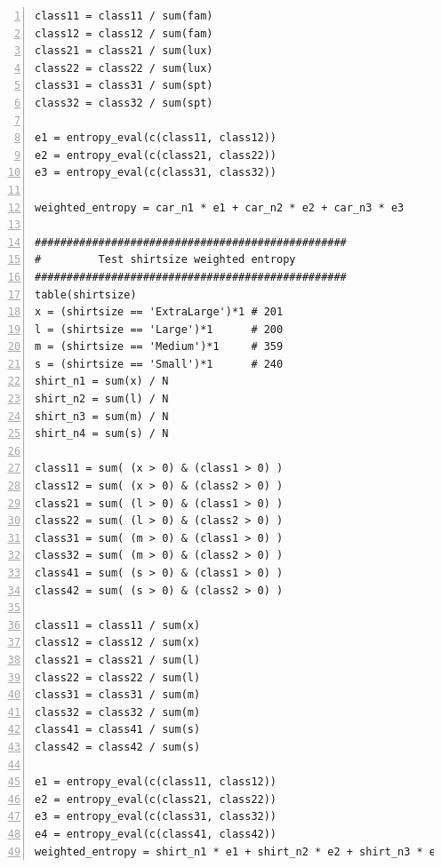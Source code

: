 \documentclass[11pt]{article}
\begin{document}
\begin{Verbatim}[numbers=left]
class11 = class11 / sum(fam)
class12 = class12 / sum(fam)
class21 = class21 / sum(lux)
class22 = class22 / sum(lux)
class31 = class31 / sum(spt)
class32 = class32 / sum(spt)

e1 = entropy_eval(c(class11, class12))
e2 = entropy_eval(c(class21, class22))
e3 = entropy_eval(c(class31, class32))

weighted_entropy = car_n1 * e1 + car_n2 * e2 + car_n3 * e3

#################################################
#         Test shirtsize weighted entropy
#################################################
table(shirtsize)
x = (shirtsize == 'ExtraLarge')*1 # 201
l = (shirtsize == 'Large')*1      # 200
m = (shirtsize == 'Medium')*1     # 359
s = (shirtsize == 'Small')*1      # 240
shirt_n1 = sum(x) / N
shirt_n2 = sum(l) / N
shirt_n3 = sum(m) / N
shirt_n4 = sum(s) / N

class11 = sum( (x > 0) & (class1 > 0) )
class12 = sum( (x > 0) & (class2 > 0) )
class21 = sum( (l > 0) & (class1 > 0) )
class22 = sum( (l > 0) & (class2 > 0) )
class31 = sum( (m > 0) & (class1 > 0) )
class32 = sum( (m > 0) & (class2 > 0) )
class41 = sum( (s > 0) & (class1 > 0) )
class42 = sum( (s > 0) & (class2 > 0) )

class11 = class11 / sum(x)
class12 = class12 / sum(x)
class21 = class21 / sum(l)
class22 = class22 / sum(l)
class31 = class31 / sum(m)
class32 = class32 / sum(m)
class41 = class41 / sum(s)
class42 = class42 / sum(s)

e1 = entropy_eval(c(class11, class12))
e2 = entropy_eval(c(class21, class22))
e3 = entropy_eval(c(class31, class32))
e4 = entropy_eval(c(class41, class42))
weighted_entropy = shirt_n1 * e1 + shirt_n2 * e2 + shirt_n3 * e3 + shirt_n4 * e4
\end{Verbatim}
\end{document}
